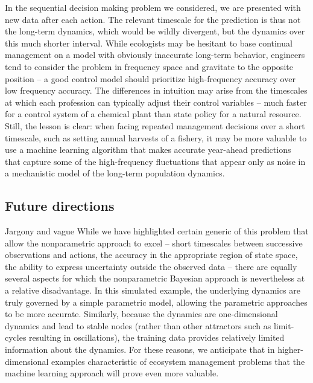 \documentclass[author-year, review]{elsarticle} %
\begin{document}
In the sequential decision making problem we considered, we are
presented with new data after each action. The relevant timescale for
the prediction is thus not the long-term dynamics, which would be wildly
divergent, but the dynamics over this much shorter interval. While
ecologists may be hesitant to base continual management on a model with
obviously inaccurate long-term behavior, engineers tend to consider the
problem in frequency space and gravitate to the opposite position -- a
good control model should prioritize high-frequency accuracy over low
frequency accuracy. The differences in intuition may arise from the
timescales at which each profession can typically adjust their control
variables -- much faster for a control system of a chemical plant than
state policy for a natural resource. Still, the lesson is clear: when
facing repeated management decisions over a short timescale, such as
setting annual harvests of a fishery, it may be more valuable to use a
machine learning algorithm that makes accurate year-ahead predictions
that capture some of the high-frequency fluctuations that appear only as
noise in a mechanistic model of the long-term population dynamics.

\subsection{Future directions}

 Jargony and vague While we have highlighted certain generic of this
problem that allow the nonparametric approach to excel -- short
timescales between successive observations and actions, the accuracy in
the appropriate region of state space, the ability to express
uncertainty outside the observed data -- there are equally several
aspects for which the nonparametric Bayesian approach is nevertheless at
a relative disadvantage. In this simulated example, the underlying
dynamics are truly governed by a simple parametric model, allowing the
parametric approaches to be more accurate. Similarly, because the
dynamics are one-dimensional dynamics and lead to stable nodes (rather
than other attractors such as limit-cycles resulting in oscillations),
the training data provides relatively limited information about the
dynamics. For these reasons, we anticipate that in higher-dimensional
examples characteristic of ecosystem management problems that the
machine learning approach will prove even more valuable.
\end{document}
